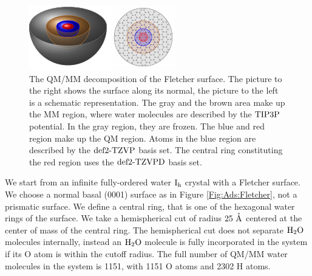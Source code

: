 \begin{figure}[t!]
\centering
\includegraphics[width=\textwidth]{TikzPics/TikzCreation/SurfaceQMMM/SurfaceQMMMAside.pdf}
\newline
\caption{The QM/MM decomposition of the Fletcher surface. The picture to the
right shows the surface along its normal, the picture to the left is a schematic
representation. The gray and the brown area make up the MM region, where water
molecules are described by the $\text{TIP3P}$ potential. In the gray region, they are
frozen. The blue and red region make up the QM region. Atoms in the blue region
are described by the $\text{def2-TZVP}$ basis set. The central ring constituting the red
region uses the $\text{def2-TZVPD}$ basis set.}
\label{Fig:Ads:QMMM}
\end{figure}

We start from an infinite fully-ordered water $\text I_\text h$ crystal with a Fletcher
surface. We choose a normal basal (0001) surface as in Figure
\ref{Fig:Ads:Fletcher}, not a prismatic surface. We define a central ring, that is one of the hexagonal
water rings of the surface. We take a hemispherical cut of radius $25~\mathring{\text{A}}$
centered at the center of mass of the central ring. The hemispherical cut does
not separate $\text H _2 \text O$ molecules internally, instead an $\text H _2 \text O$ molecule is fully
incorporated in the system if its O atom is within the cutoff radius. The full
number of QM/MM water molecules in the system is 1151, with 1151 O atoms and
2302 H atoms.

